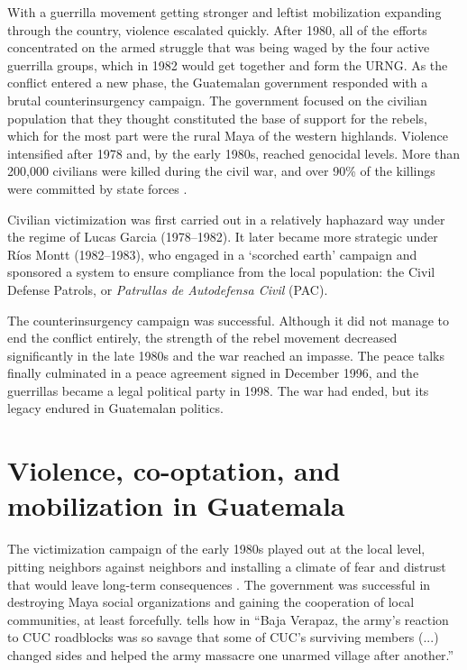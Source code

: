 \documentclass[12pt, notitlepage]{article}
\begin{document}
With a guerrilla movement getting stronger and leftist mobilization expanding through the country, violence escalated quickly.
After 1980, all of the efforts concentrated on the armed struggle that was being waged by the four active guerrilla groups, which in 1982 would get together and form the URNG.
As the conflict entered a new phase, the Guatemalan government responded with a brutal counterinsurgency campaign.
The government focused on the civilian population that they thought constituted the base of support for the rebels, which for the most part were the rural Maya of the western highlands.
Violence intensified after 1978 and, by the early 1980s, reached genocidal levels.
More than 200,000 civilians were killed during the civil war, and over 90\% of the killings were committed by state forces \citep{Ball:1999aa, CEH:1999aa}.

Civilian victimization was first carried out in a relatively haphazard way under the regime of Lucas Garcia (1978--1982).
It later became more strategic under Ríos Montt (1982--1983), who engaged in a `scorched earth' campaign and sponsored a system to ensure compliance from the local population: the Civil Defense Patrols, or \textit{Patrullas de Autodefensa Civil} (PAC).

The counterinsurgency campaign was successful.
Although it did not manage to end the conflict entirely, the strength of the rebel movement decreased significantly in the late 1980s and the war reached an impasse.
The peace talks finally culminated in a peace agreement signed in December 1996, and the guerrillas became a legal political party in 1998.
The war had ended, but its legacy endured in Guatemalan politics.

\section*{Violence, co-optation, and mobilization in Guatemala}

The victimization campaign of the early 1980s played out at the local level, pitting neighbors against neighbors and installing a climate of fear and distrust that would leave long-term consequences \citep{Burrell:2013aa}.
The government was successful in destroying Maya social organizations and gaining the cooperation of local communities, at least forcefully.
\citet[101]{Stoll:1999aa} tells how in ``Baja Verapaz, the army's reaction to CUC roadblocks was so savage that some of CUC's surviving members (...) changed sides and helped the army massacre one unarmed village after another.''
\end{document}
